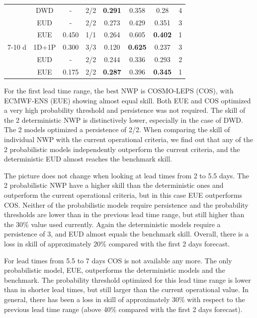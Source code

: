 \documentclass[preprint,12pt]{elsarticle}
\begin{document}
\begin{table}
\begin{tabular}{cccccccc}
         & DWD & - & 2/2 & \textbf{0.291} & 0.358 & 0.28 & 4 \\
         & EUD & - & 2/2 & 0.273 & 0.429 & 0.351 & 3 \\
         & EUE & 0.450 & 1/1 & 0.264 & 0.605 & \textbf{0.402} & 1 \\
         \hline
        7-10 d& 1D+1P & 0.300& 3/3 & 0.120 & \textbf{0.625} & 0.237 & 3 \\
         & EUD & - & 2/2 & 0.244 & 0.336 & 0.293 & 2 \\
         & EUE & 0.175 & 2/2 & \textbf{0.287} & 0.396 & \textbf{0.345} & 1 \\
         \hline
    \end{tabular}
    \label{tab:NWP_optimization}
\end{table}

For the first lead time range, the best NWP is COSMO-LEPS (COS), with ECMWF-ENS (EUE) showing almost equal skill. Both EUE and COS optimized a very high probability threshold and persistence was not required. The skill of the 2 deterministic NWP is distinctively lower, especially in the case of DWD. The 2 models optimized a persistence of 2/2. When comparing the skill of individual NWP with the current operational criteria, we find out that any of the 2 probabilistic models independently outperform the current criteria, and the deterministic EUD almost reaches the benchmark skill.

The picture does not change when looking at lead times from 2 to 5.5 days. The 2 probabilistic NWP have a higher skill than the deterministic ones and outperform the current operational criteria, but in this case EUE outperforms COS. Neither of the probabilistic models require persistence and the probability thresholds are lower than in the previous lead time range, but still higher than the 30\% value used currently. Again the deterministic models require a persistence of 3, and EUD almost equals the benchmark skill. Overall, there is a loss in skill of approximately 20\% compared with the first 2 days forecast. 

For lead times from 5.5 to 7 days COS is not available any more. The only probabilistic model, EUE, outperforms the deterministic models and the benchmark. The probability threshold optimized for this lead time range is lower than in shorter lead times, but still larger than the current operational value. In general, there has been a loss in skill of approximately 30\% with respect to the previous lead time range (above 40\% compared with the first 2 days forecast).
\end{document}
